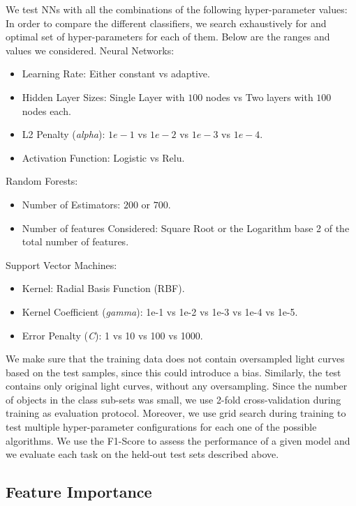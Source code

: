 \documentclass[a4paper,fleqn,usenatbib]{mnras}
\begin{document}
We test NNs with all the combinations of the following hyper-parameter values:
In order to compare the different classifiers, we search exhaustively for and optimal set of hyper-parameters for each of them. Below are the ranges and values we considered.
Neural Networks:
\begin{itemize}
    \item Learning Rate: Either constant vs adaptive.
    \item Hidden Layer Sizes: Single Layer with $100$ nodes vs Two layers with
    $100$ nodes each.
    \item L2 Penalty (\textit{alpha}): $1e-1$ vs $1e-2$ vs $1e-3$ vs $1e-4$.
    \item Activation Function: Logistic vs Relu.
\end{itemize}

Random Forests:
\begin{itemize}
    \item Number of Estimators: $200$ or $700$.
    \item Number of features Considered: Square Root or the Logarithm 
    base 2 of the total number of features.
\end{itemize}

Support Vector Machines:
\begin{itemize}
    \item Kernel: Radial Basis Function (RBF).
    \item Kernel Coefficient (\textit{gamma}): 1e-1 vs 1e-2 vs 1e-3 vs 1e-4 vs 1e-5.
    \item Error Penalty (\textit{C}): 1 vs 10 vs 100 vs 1000. 
\end{itemize}

We make sure that the training data does not contain oversampled
light curves based on the test samples, since
this could introduce a bias.  
Similarly, the test contains only original light curves, without any oversampling.
Since the number of objects in the class sub-sets was
small, we use 2-fold cross-validation during training as evaluation
protocol. 
Moreover, we use grid search during training to test multiple
hyper-parameter configurations for each one  of the possible
algorithms. 
We use the F1-Score to assess the performance of a given model and 
we evaluate each task on the held-out test sets described above.


\subsection{Feature Importance} \label{subsection_importances}
\end{document}
